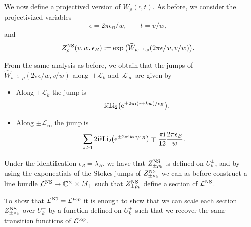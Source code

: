 \documentclass[pdftex]{sigma}
\numberwithin{equation}{section}
\begin{document}
We now define a projectived version of $W_{\rho}(\epsilon,t)$. As before, we consider the projectivized variables
\begin{equation*}
 \epsilon=2\pi \epsilon_B/w, \qquad t=v/w,
\end{equation*}
and
\begin{equation*}
 Z_{\rho}^{\rm NS}(v,w,\epsilon_B):=\exp\big(\widehat{W}_{w^{-1}\cdot \rho}(2\pi\epsilon/w, v/w)\big).
\end{equation*}

From the same analysis as before, we obtain that the jumps of $\widehat{W}_{w^{-1}\cdot \rho}(2\pi\epsilon/w, v/w)$ along~$\pm \mathcal{L}_k$ and~$\mathcal{L}_{\infty}$ are given by
\begin{itemize}\itemsep=0pt
\item Along $\pm \mathcal{L}_k$ the jump is
 \begin{equation*}
 -\mathrm{i}\check{\epsilon}\mathrm{Li}_2\big({\rm e}^{\pm 2\pi \mathrm{i}(v+kw)/\epsilon_B}\big).
 \end{equation*}
 \item Along $\pm \mathcal{L}_{\infty}$ the jump is
 \begin{equation*}
 \sum_{k\geq 1} 2\mathrm{i}\check{\epsilon}\mathrm{Li}_2\big({\rm e}^{\pm 2\pi {\rm i}kw/\epsilon_B}\big)\mp \frac{\pi \mathrm{i} }{12}\frac{2\pi \epsilon_B}{w}.
 \end{equation*}
\end{itemize}

Under the identification $\epsilon_B=\lambda_B$, we have that $Z_{\pm \rho_k}^{\rm NS}$ is defined on $U_k^{\pm}$, and by using the exponentials of the Stokes jumps of $Z_{\pm \rho_k}^{\rm NS}$ we can as before construct a line bundle $\mathcal{L}^{\rm NS}\to \mathbb{C}^{\times}\times M_{+}$ such that $Z_{\pm \rho_k}^{\rm NS}$ define a section of $\mathcal{L}^{\rm NS}$.

To show that $\mathcal{L}^{\rm NS}=\mathcal{L}^{{\rm top}}$ it is enough to show that we can scale each section $Z_{\pm \rho_k}^{\rm NS}$ over $U_{k}^{\pm}$ by a function defined on $U_k^{\pm}$ such that we recover the same transition functions of $\mathcal{L}^{{\rm top}}$.
\end{document}
